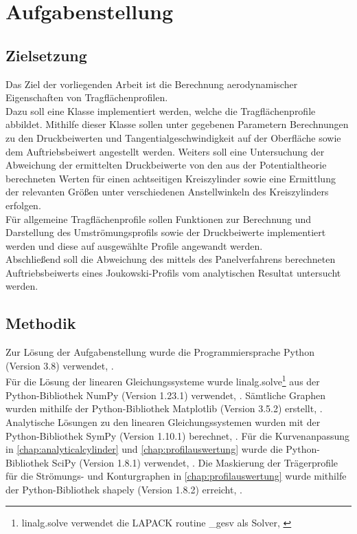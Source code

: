 \chapter{Aufgabenstellung}
%
\section{Zielsetzung}
Das Ziel der vorliegenden Arbeit ist die Berechnung  aerodynamischer Eigenschaften von Tragflächenprofilen. \\ Dazu soll eine Klasse implementiert werden, welche die Tragflächenprofile abbildet. Mithilfe dieser Klasse sollen unter gegebenen Parametern Berechnungen zu den Druckbeiwerten und Tangentialgeschwindigkeit auf der Oberfläche sowie dem Auftriebsbeiwert angestellt werden. 
Weiters soll eine Untersuchung der Abweichung der ermittelten Druckbeiwerte von den aus der Potentialtheorie berechneten Werten für einen achtseitigen Kreiszylinder sowie eine Ermittlung der relevanten Größen unter verschiedenen Anstellwinkeln des Kreiszylinders erfolgen. \\
Für allgemeine Tragflächenprofile sollen Funktionen zur Berechnung und Darstellung des Umströmungsprofils sowie der Druckbeiwerte implementiert werden und diese auf ausgewählte Profile angewandt werden. \\
Abschließend soll die Abweichung des mittels des Panelverfahrens berechneten Auftriebsbeiwerts eines Joukowski-Profils vom analytischen Resultat untersucht werden.

\section{Methodik}
Zur Lösung der Aufgabenstellung wurde die Programmiersprache Python (Version 3.8) verwendet, \cite{python2009}. \\Für die Lösung der linearen Gleichungssysteme wurde linalg.solve\footnote{linalg.solve verwendet die LAPACK routine \_gesv als Solver,  \cite{harris2020array}} aus der Python-Bibliothek NumPy (Version 1.23.1) verwendet, \cite{harris2020array}. Sämtliche Graphen wurden mithilfe der Python-Bibliothek Matplotlib (Version 3.5.2) erstellt, \cite{Hunter:2007}. Analytische Lösungen zu den linearen Gleichungssystemen  wurden mit der Python-Bibliothek SymPy (Version 1.10.1) berechnet, \cite{Sympy}. Für die Kurvenanpassung in \ref{chap:analyticalcylinder} und \ref{chap:profilauswertung} wurde die Python-Bibliothek SciPy (Version 1.8.1) verwendet, \cite{2020SciPy-NMeth}. Die Maskierung der Trägerprofile für die Strömungs- und Konturgraphen in \ref{chap:profilauswertung} wurde mithilfe der Python-Bibliothek shapely (Version 1.8.2) erreicht, \cite{shapely2007}.